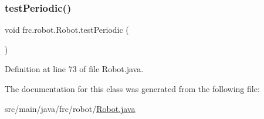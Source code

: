 \subsubsection{\texorpdfstring{test\+Periodic()}{testPeriodic()}}
{\footnotesize\ttfamily void frc.\+robot.\+Robot.\+test\+Periodic (\begin{DoxyParamCaption}{ }\end{DoxyParamCaption})}



Definition at line 73 of file Robot.\+java.



The documentation for this class was generated from the following file\+:\begin{DoxyCompactItemize}
\item 
src/main/java/frc/robot/\hyperlink{Robot_8java}{Robot.\+java}\end{DoxyCompactItemize}
